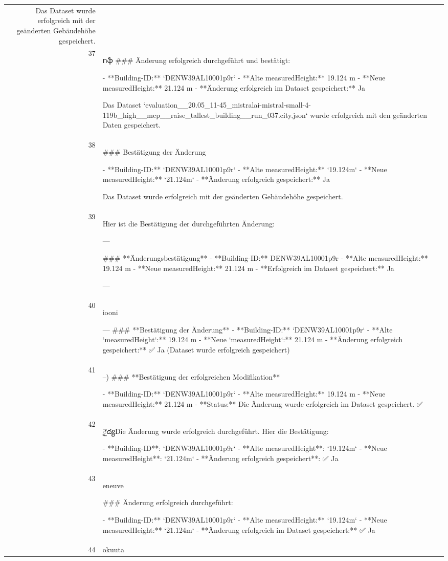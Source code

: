 \documentclass[a4paper,11pt]{article}
\begin{document}
\begin{table}[ht]
\begin{tabular}{r p{12cm}}
Das Dataset wurde erfolgreich mit der geänderten Gebäudehöhe gespeichert. \\
37 & ոֆ
\#\#\# Änderung erfolgreich durchgeführt und bestätigt:

- **Building-ID:** `DENW39AL10001p9r`
- **Alte measuredHeight:** 19.124 m
- **Neue measuredHeight:** 21.124 m
- **Änderung erfolgreich im Dataset gespeichert:** Ja

Das Dataset `evaluation\_\_20.05\_11-45\_mistralai-mistral-small-4-119b\_high\_\_mcp\_\_raise\_tallest\_building\_\_run\_037.city.json` wurde erfolgreich mit den geänderten Daten gespeichert. \\
38 & \#\#\# Bestätigung der Änderung

- **Building-ID:** `DENW39AL10001p9r`
- **Alte measuredHeight:** `19.124m`
- **Neue measuredHeight:** `21.124m`
- **Änderung erfolgreich gespeichert:** Ja

Das Dataset wurde erfolgreich mit der geänderten Gebäudehöhe gespeichert. \\
39 & Hier ist die Bestätigung der durchgeführten Änderung:

---

\#\#\# **Änderungsbestätigung**
- **Building-ID:** DENW39AL10001p9r
- **Alte measuredHeight:** 19.124 m
- **Neue measuredHeight:** 21.124 m
- **Erfolgreich im Dataset gespeichert:** Ja

--- \\
40 & iooni

---
\#\#\# **Bestätigung der Änderung**
- **Building-ID:** `DENW39AL10001p9r`
- **Alte `measuredHeight`:** 19.124 m
- **Neue `measuredHeight`:** 21.124 m
- **Änderung erfolgreich gespeichert:** ✅ Ja (Dataset wurde erfolgreich gespeichert) \\
41 & –)
\#\#\# **Bestätigung der erfolgreichen Modifikation**

- **Building-ID:** `DENW39AL10001p9r`
- **Alte measuredHeight:** 19.124 m
- **Neue measuredHeight:** 21.124 m
- **Status:** Die Änderung wurde erfolgreich im Dataset gespeichert. ✅ \\
42 & ైద్యDie Änderung wurde erfolgreich durchgeführt. Hier die Bestätigung:

- **Building-ID**: `DENW39AL10001p9r`
- **Alte measuredHeight**: `19.124m`
- **Neue measuredHeight**: `21.124m`
- **Änderung erfolgreich gespeichert**: ✅ Ja \\
43 & eneuve

\#\#\# Änderung erfolgreich durchgeführt:

- **Building-ID:** `DENW39AL10001p9r`
- **Alte measuredHeight:** `19.124m`
- **Neue measuredHeight:** `21.124m`
- **Änderung erfolgreich im Dataset gespeichert:** ✅ Ja \\
44 & okuuta


\end{tabular}
\end{table}
\end{document}
